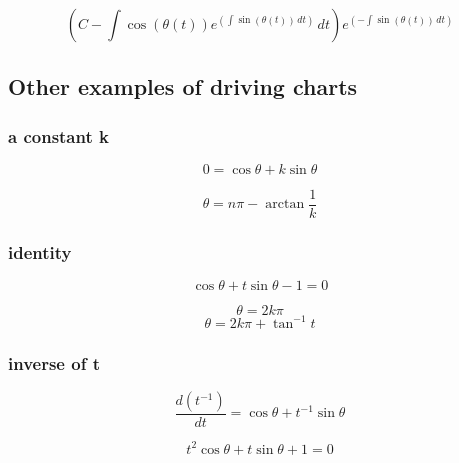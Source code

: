 \documentclass{article}
\begin{document}
\begin{equation}
    {\left(C - \int \cos\left(\theta\left(t\right)\right) e^{\left(\int \sin\left(\theta\left(t\right)\right)\,{d t}\right)}\,{d t}\right)} e^{\left(-\int \sin\left(\theta\left(t\right)\right)\,{d t}\right)}
\end{equation}


\subsection{Other examples of driving charts}\label{sec:meodc}

\subsubsection{a constant k}

\begin{equation}
    0 = \cos \theta + k \sin \theta
\end{equation}

\begin{equation}
    \theta = n\pi - \arctan \frac{1}{k}
\end{equation}

\subsubsection{identity}

\begin{equation}
    \cos \theta + t \sin \theta - 1 = 0
\end{equation}

\begin{equation}
    \theta = 2k\pi
\end{equation}
\begin{equation}
    \theta = 2k\pi + \tan^{-1} t
\end{equation}

\subsubsection{inverse of t}

\begin{equation}
    \frac{d(t^{-1})}{dt} = \cos \theta + t^{-1} \sin \theta
\end{equation}

\begin{equation}
    t^2 \cos \theta + t \sin \theta + 1 = 0
\end{equation}
\end{document}
